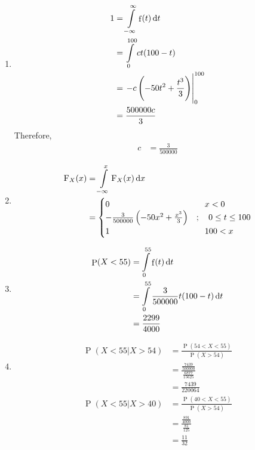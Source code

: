 \documentclass[fleqn, a4paper, 11pt, oneside]{amsart}
\theoremstyle{definition}
\theoremstyle{theorem}
\DeclareMathOperator{\prob}{\mathrm{P}}
\DeclareMathOperator{\pdf}{\mathrm{f}}
\newcommand*{\cdf}[1]{\mathrm{F}_{#1}}
\begin{document}
\begin{solution}
	\begin{enumerate}[leftmargin=*]
		\item
			\begin{align*}
				1 &= \int\limits_{-\infty}^{\infty} \pdf(t) \dif t\\
				&= \int\limits_{0}^{100} c t (100 - t)\\
				&= \left. -c \left( -50 t^2 + \frac{t^3}{3} \right) \right|_{0}^{100}\\
				&= \frac{500000 c}{3}
			\end{align*}
			Therefore,
			\begin{align*}
				c &= \frac{3}{500000}
			\end{align*}
		\item
			\begin{align*}
				\cdf{X}(x) &= \int\limits_{-\infty}^{x} \cdf{X}(x) \dif x\\
				&=
					\begin{cases}
						0 &\quad x < 0\\
						-\frac{3}{500000} \left( -50 x^2 + \frac{x^3}{3} \right) &;\quad 0 \le t \le 100\\
						1 &\quad 100 < x\\
					\end{cases}
			\end{align*}
		\item
			\begin{align*}
				\prob(X < 55) &= \int\limits_{0}^{55} \pdf(t) \dif t\\
				&= \int\limits_{0}^{55} \frac{3}{500000} t (100 - t) \dif t\\
				&= \frac{2299}{4000}
			\end{align*}
		\item
			\begin{align*}
				\prob(X < 55 | X > 54) &= \frac{\prob(54 < X < 55)}{\prob(X > 54)}\\
				&= \frac{\frac{7439}{500000}}{\frac{6877}{15625}}\\
				&= \frac{7439}{220064}
			\end{align*}
			\begin{align*}
				\prob(X < 55 | X > 40) &= \frac{\prob(40 < X < 55)}{\prob(X > 54)}\\
				&= \frac{\frac{891}{4000}}{\frac{81}{125}}\\
				&= \frac{11}{32}
			\end{align*}
	\end{enumerate}
\end{solution}
\end{document}

